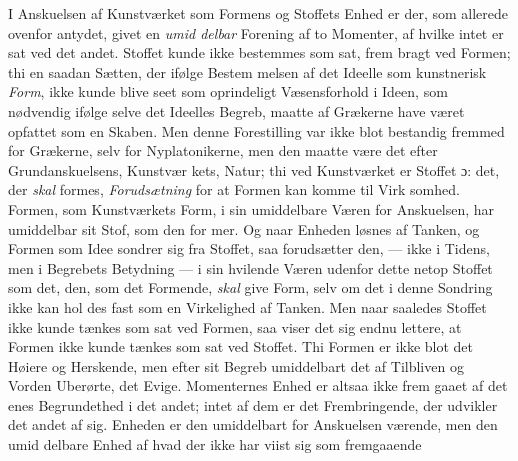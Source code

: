 \documentclass[12pt,a4paper]{book}
\begin{document}
I Anskuelsen af Kunstværket som Formens og Stoffets
Enhed er der, som allerede ovenfor antydet, givet en \emph{umid\-%
delbar} Forening af to Momenter, af hvilke intet er sat ved
det andet. Stoffet kunde ikke bestemmes som sat, frem\-%
bragt ved Formen; thi en saadan Sætten, der ifølge Bestem\-%
melsen af det Ideelle som kunstnerisk \emph{Form}, ikke kunde blive
seet som oprindeligt Væsensforhold i Ideen, som nødvendig
ifølge selve det Ideelles Begreb, maatte af Grækerne have været
opfattet som en Skaben. Men denne Forestilling var ikke
blot bestandig fremmed for Grækerne, selv for Nyplatonikerne,
men den maatte være det efter Grundanskuelsens, Kunstvær\-%
kets, Natur; thi ved Kunstværket er Stoffet ɔ: det, der \emph{skal}
formes, \emph{Forudsætning} for at Formen kan komme til Virk\-%
somhed. Formen, som Kunstværkets Form, i sin umiddelbare
Væren for Anskuelsen, har umiddelbar sit Stof, som den for\-%
mer. Og naar Enheden løsnes af Tanken, og Formen som
Idee sondrer sig fra Stoffet, saa forudsætter den, --- ikke i
Tidens, men i Begrebets Betydning --- i sin hvilende Væren
udenfor dette netop Stoffet som det, den, som det Formende,
\emph{skal} give Form, selv om det i denne Sondring ikke kan hol\-%
des fast som en Virkelighed af Tanken. Men naar saaledes
Stoffet ikke kunde tænkes som sat ved Formen, saa viser det
sig endnu lettere, at Formen ikke kunde tænkes som sat ved
Stoffet. Thi Formen er ikke blot det Høiere og Herskende,
men efter sit Begreb umiddelbart det af Tilbliven og Vorden
Uberørte, det Evige. Momenternes Enhed er altsaa ikke frem\-%
gaaet af det enes Begrundethed i det andet; intet af dem er
det Frembringende, der udvikler det andet af sig. Enheden
er den umiddelbart for Anskuelsen værende, men den umid\-%
delbare Enhed af hvad der ikke har viist sig som fremgaaende
\end{document}
